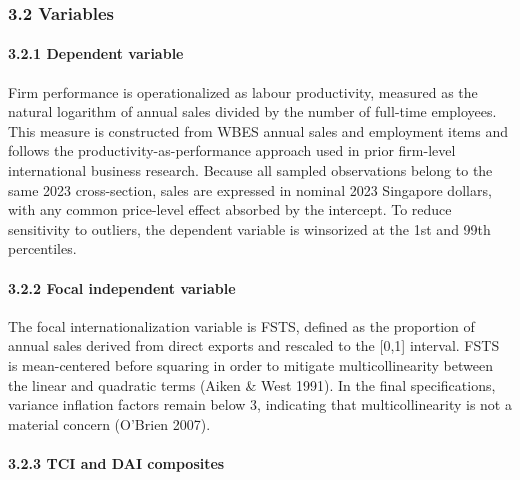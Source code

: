 \documentclass[12pt,a4paper]{article}
\begin{document}
\hypertarget{32-variables}{%
\subsubsection{3.2 Variables}\label{32-variables}}

\hypertarget{321-dependent-variable}{%
\paragraph{3.2.1 Dependent variable}\label{321-dependent-variable}}

Firm performance is operationalized as labour productivity, measured as
the natural logarithm of annual sales divided by the number of full-time
employees. This measure is constructed from WBES annual sales and
employment items and follows the productivity-as-performance approach
used in prior firm-level international business research. Because all
sampled observations belong to the same 2023 cross-section, sales are
expressed in nominal 2023 Singapore dollars, with any common price-level
effect absorbed by the intercept. To reduce sensitivity to outliers, the
dependent variable is winsorized at the 1st and 99th percentiles.

\hypertarget{322-focal-independent-variable}{%
\paragraph{3.2.2 Focal independent
variable}\label{322-focal-independent-variable}}

The focal internationalization variable is FSTS, defined as the
proportion of annual sales derived from direct exports and rescaled to
the {[}0,1{]} interval. FSTS is mean-centered before squaring in order
to mitigate multicollinearity between the linear and quadratic terms
(Aiken \& West 1991). In the final specifications, variance inflation
factors remain below 3, indicating that multicollinearity is not a
material concern (O'Brien 2007).

\hypertarget{323-tci-and-dai-composites}{%
\paragraph{3.2.3 TCI and DAI
composites}\label{323-tci-and-dai-composites}}
\end{document}
